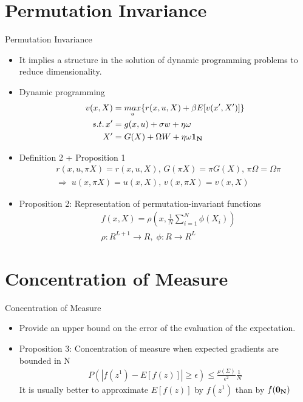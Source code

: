 \documentclass[dvipsnames,mathserif]{beamer}
\begin{document}
{\section{Permutation Invariance}
\begin{frame}{Permutation Invariance}
    \begin{itemize}
        \item It implies a structure in the solution of dynamic programming problems to reduce dimensionality.\\
        \vspace{0.2cm}
        \item Dynamic programming\\
        \begin{align*}
        v(x,X) &= \underset{u}{max}\{r(x,u,X) + \beta E[v(x',X')]\}\\
        s.t.\, x' &= g(x,u) + \sigma w + \eta \omega\\
        X'&= G(X) + \Omega W + \eta\omega\bf{1}_{N}
        \end{align*}
        \item Definition 2 + Proposition 1
        \begin{align*}
        &r(x,u,\pi X) = r(x,u,X),\,G(\pi X) = \pi G(X),\,\pi \Omega = \Omega \pi \\
        &\Rightarrow \; u(x,\pi X) = u(x,X),\,v(x,\pi X) = v(x,X)
        \end{align*}
        \item Proposition 2: Representation of permutation-invariant functions
        \begin{align*}
        &f(x,X) = \rho(x,\frac{1}{N}\sum_{i=1}^{N}\phi(X_i))\\
        &\rho: R^{L+1} \rightarrow R ,\; \phi: R \rightarrow R^{L}
        \end{align*}
    \end{itemize}
\end{frame}


\section{Concentration of Measure}
\begin{frame}{Concentration of Measure}
    \begin{itemize}
        \item Provide an upper bound on the error of the evaluation of the expectation.\\ 
        \vspace{0.1cm}
        \item Proposition 3: Concentration of measure when expected gradients are bounded in N
        \begin{align*}
        P(|f(z^1) - E[f(z)]| \geq \epsilon) \leq \frac{\rho(\Sigma)}{\epsilon^2}\frac{1}{N}
        \end{align*}
        It is usually better to approximate $E [f (z)]$ by $f (z^1)$ than by $f(\bf{0}_N)$
        \vspace{0.2cm}
    \end{itemize}
\end{frame}

}
\end{document}
